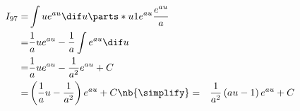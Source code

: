 \def\no{97}
\def\theintegral{\(\int{ue^{au}}\;\dif{u}%
\enspace=\enspace%
\frac{1}{a^2}{\left(au-1\right)}e^{au}\;+\;C\)}

\begin{align*}
%
{I}_{\no}
=&  \int u e^{au} \dif u
\parts*
{u}{1}
{e^{au}}{\frac{e^{au}}{a}}
\\
=&  \frac{1}{a}ue^{au}
  - \frac{1}{a} \int e^{au} \dif u
\\
=&  \frac{1}{a}ue^{au}
  - \frac{1}{a^2}e^{au} + C
\\
=&  \left(
      \frac{1}{a}u
    - \frac{1}{a^2}
    \right) e^{au} + C
\nb{\simplify}
%
%
=&  \frac{1}{a^2}\left(au-1\right)e^{au} + C
%
\end{align*}

